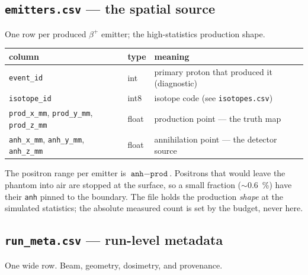 \documentclass[11pt]{article}
\newcommand{\file}[1]{\texttt{#1}}
\begin{document}
\subsection{\file{emitters.csv} --- the spatial source}

One row per produced $\beta^{+}$ emitter; the high-statistics production shape.

\begin{center}
\begin{tabular}{@{}lll@{}}
\toprule
column & type & meaning \\
\midrule
\file{event\_id} & int & primary proton that produced it (diagnostic) \\
\file{isotope\_id} & int8 & isotope code (see \file{isotopes.csv}) \\
\file{prod\_x\_mm}, \file{prod\_y\_mm}, \file{prod\_z\_mm} & float & production point --- the truth map \\
\file{anh\_x\_mm}, \file{anh\_y\_mm}, \file{anh\_z\_mm} & float & annihilation point --- the detector source \\
\bottomrule
\end{tabular}
\end{center}

The positron range per emitter is $\file{anh}-\file{prod}$. Positrons that would
leave the phantom into air are stopped at the surface, so a small fraction
($\sim$\SI{0.6}{\percent}) have their \file{anh} pinned to the boundary. The
file holds the production \emph{shape} at the simulated statistics; the absolute
measured count is set by the budget, never here.

\subsection{\file{run\_meta.csv} --- run-level metadata}

One wide row. Beam, geometry, dosimetry, and provenance.
\end{document}

